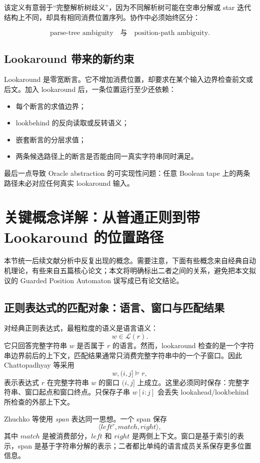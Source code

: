 \documentclass[UTF8,a4paper,12pt]{ctexart}
\begin{document}
该定义有意弱于“完整解析树歧义”，因为不同解析树可能在空串分解或 star 迭代结构上不同，却具有相同消费位置序列。协作中必须始终区分：

\[
\text{parse-tree ambiguity}
\quad\text{与}\quad
\text{position-path ambiguity}.
\]

\subsection{Lookaround 带来的新约束}

Lookaround 是零宽断言。它不增加消费位置，却要求在某个输入边界检查前文或后文。加入 lookaround 后，一条位置运行至少还依赖：

\begin{itemize}
  \item 每个断言的求值边界；
  \item lookbehind 的反向读取或反转语义；
  \item 嵌套断言的分层求值；
  \item 两条候选路径上的断言是否能由同一真实字符串同时满足。
\end{itemize}

最后一点导致 Oracle abstraction 的可实现性问题：任意 Boolean tape 上的两条路径未必对应任何真实 lookaround 输入。


\section{关键概念详解：从普通正则到带 Lookaround 的位置路径}

本节统一后续文献分析中反复出现的概念。需要注意，下面有些概念来自经典自动机理论，有些来自五篇核心论文；本文将明确标出二者之间的关系，避免把本文拟议的 Guarded Position Automaton 误写成已有论文结论。

\subsection{正则表达式的匹配对象：语言、窗口与匹配结果}

对经典正则表达式，最粗粒度的语义是语言语义：
\[
w\in\mathcal L(r).
\]
它只回答完整字符串 $w$ 是否属于 $r$ 的语言。然而，lookaround 检查的是一个字符串边界前后的上下文，匹配结果通常只消费完整字符串中的一个子窗口。因此 Chattopadhyay 等采用
\[
w,(i,j]\models r,
\]
表示表达式 $r$ 在完整字符串 $w$ 的窗口 $(i,j]$ 上成立\cite[pp.~2--3]{chattopadhyay2025}。这里必须同时保存：完整字符串、窗口起点和窗口终点。只保存子串 $w[i:j]$ 会丢失 lookahead/lookbehind 所检查的外部上下文。

Zhuchko 等使用 \emph{span} 表达同一思想。一个 span 保存
\[
\langle left^r,match,right\rangle,
\]
其中 $match$ 是被消费部分，$left$ 和 $right$ 是两侧上下文\cite[pp.~2--5]{zhuchko2024}。窗口是基于索引的表示，span 是基于字符串分解的表示；二者都比单纯的语言成员关系保存更多位置信息。
\end{document}
